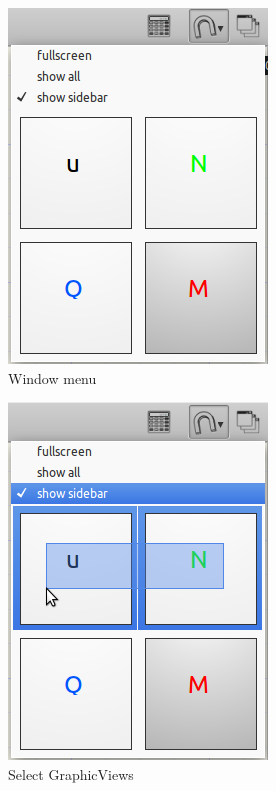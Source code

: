 \documentclass[a4paper,11pt]{report}
\begin{document}
\begin{minipage}[h]{7cm}
\begin{figure}[H]
\begin{center}
\includegraphics[scale=0.6]{./pictures/windowtoolbar.png}
\caption{Window menu}
\label{pic:windowtoolbar}
\end{center}
\end{figure}
\begin{figure}[H]
\begin{center}
\includegraphics[scale=0.6]{./pictures/windowtoolbar2.png}
\caption{Select GraphicViews}
\label{pic:windowtoolbar2}
\end{center}
\end{figure}
\end{minipage}
\end{document}
